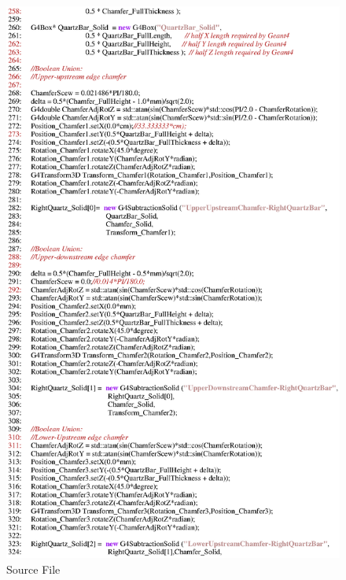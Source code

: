\begin{figure}[ht]
  \hspace{0cm}
  \includegraphics[scale=0.8]{./figures5/QweakSimCerenkovDetector.cc-p5.eps}
  \caption{\label{SourceV5} Source File}
           \label{fig:V-SC-9}
\end{figure}
\clearpage

